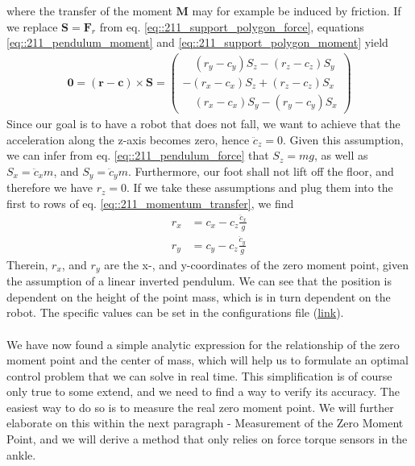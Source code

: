 where the transfer of the moment $\bm{M}$ may for example be induced by friction. If we replace $\bm{S}=\bm{F}_r$ from eq. \ref{eq::211_support_polygon_force}, equations \ref{eq::211_pendulum_moment} and \ref{eq::211_support_polygon_moment} yield 
\begin{align}
	\bm{0} = (\bm{r}-\bm{c})\times\bm{S} = \begin{pmatrix}
	\quad(r_y - c_y)S_z - (r_z - c_z)S_y \\
	-(r_x - c_x)S_z + (r_z - c_z)S_x \\
	\quad(r_x - c_x)S_y - (r_y - c_y)S_x
	\end{pmatrix}
	\label{eq::211_momentum_transfer}
\end{align}
Since our goal is to have a robot that does not fall, we want to achieve that the acceleration along the z-axis becomes zero, hence $\ddot{c}_z=0$. Given this assumption, we can infer from eq. \ref{eq::211_pendulum_force} that $S_z=mg$, as well as $S_x = \ddot{c}_xm$, and $S_y = \ddot{c}_ym$. Furthermore, our foot shall not lift off the floor, and therefore we have $r_z=0$. If we take these assumptions and plug them into the first to rows of eq. \ref{eq::211_momentum_transfer}, we find
\begin{align}
	r_x &= c_x - c_z\frac{\ddot{c}_x}{g}
	\label{eq::211_zmp_x}\\
	r_y &= c_y - c_z\frac{\ddot{c}_y}{g}
	\label{eq::211_zmp_y}
\end{align}
Therein, $r_x$, and $r_y$ are the x-, and y-coordinates of the zero moment point, given the assumption of a linear inverted pendulum. We can see that the position is dependent on the height of the point mass, which is in turn dependent on the robot. The specific values can be set in the configurations file (\href{https://github.com/mhubii/nmpc_pattern_generator/blob/bc79a6d4f9bcfd3794146355af44429f5b7a9fe0/libs/pattern_generator/configs.yaml#L27}{\underline{link}}).
\\\\
We have now found a simple analytic expression for the relationship of the zero moment point and the center of mass, which will help us to formulate an optimal control problem that we can solve in real time. This simplification is of course only true to some extend, and we need to find a way to verify its accuracy. The easiest way to do so is to measure the real zero moment point. We will further elaborate on this within the next paragraph - Measurement of the Zero Moment Point, and we will derive a method that only relies on force torque sensors in the ankle.
\FloatBarrier
